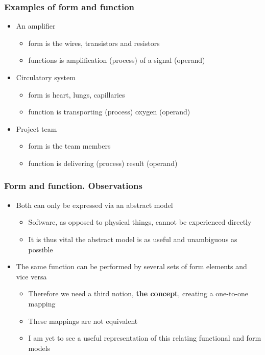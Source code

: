 \documentclass[10pt, compress]{beamer}
\begin{document}
\begin{frame}[fragile]
  \frametitle{Examples of form and function}
  \begin{itemize}
  	\item An amplifier
	\begin{itemize}
		\item form is the wires, transistors and resistors
		\item functions is amplification (process) of a signal (operand)
	\end{itemize}
	\item Circulatory system
	\begin{itemize}
		\item form is heart, lungs, capillaries
		\item function is transporting (process) oxygen (operand)
	\end{itemize}
	\item Project team
	\begin{itemize}
		\item form is the team members
		\item function is delivering (process) result (operand)
	\end{itemize}

  \end{itemize}
	
\end{frame}

\begin{frame}[fragile]
  \frametitle{Form and function. Observations}
  \begin{itemize}
  	\item Both can only be expressed via an abstract model
	\begin{itemize}
		\item Software, as opposed to physical things, cannot be experienced directly
		\item It is thus vital the abstract model is as useful and unambiguous as possible 
	\end{itemize}
	\item The same function can be performed by several sets of form elements and vice versa
	\begin{itemize}
		\item Therefore we need a third notion, \textbf{the concept}, creating a one-to-one mapping
		\item These mappings are not equivalent 
		\item I am yet to see a useful representation of this relating functional and form models
	\end{itemize}
  \end{itemize}
	
\end{frame}
\end{document}
